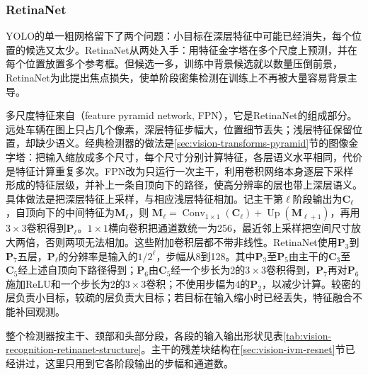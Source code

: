 \subsubsection{RetinaNet}
\label{sec:vision-recognition-fpn}
\label{sec:vision-recognition-retinanet}

YOLO的单一粗网格留下了两个问题：小目标在深层特征中可能已经消失，每个位置的候选又太少。RetinaNet从两处入手：用特征金字塔在多个尺度上预测，并在每个位置放置多个参考框。但候选一多，训练中背景候选就以数量压倒前景，RetinaNet为此提出焦点损失，使单阶段密集检测在训练上不再被大量容易背景主导。

多尺度特征来自（feature pyramid network, FPN），它是RetinaNet的组成部分。远处车辆在图上只占几个像素，深层特征步幅大，位置细节丢失；浅层特征保留位置，却缺少语义。经典检测器的做法是\ref{sec:vision-transforms-pyramid}节的图像金字塔：把输入缩放成多个尺寸，每个尺寸分别计算特征，各层语义水平相同，代价是特征计算重复多次。FPN改为只运行一次主干，利用卷积网络本身逐层下采样形成的特征层级，并补上一条自顶向下的路径，使高分辨率的层也带上深层语义。具体做法是把深层特征上采样，与相应浅层特征相加。记主干第$\ell$阶段输出为$\bm{C}_\ell$，自顶向下的中间特征为$\bm{M}_\ell$，则
$\bm{M}_\ell=\operatorname{Conv}_{1\times1}(\bm{C}_\ell)+\operatorname{Up}(\bm{M}_{\ell+1})$，再用$3\times3$卷积得到$\bm{P}_\ell$。$1\times1$横向卷积把通道数统一为256，最近邻上采样把空间尺寸放大两倍，否则两项无法相加。这些附加卷积层都不带非线性。RetinaNet使用$\bm{P}_3$到$\bm{P}_7$五层，$\bm{P}_\ell$的分辨率是输入的$1/2^\ell$，步幅从8到128。其中$\bm{P}_3$至$\bm{P}_5$由主干的$\bm{C}_3$至$\bm{C}_5$经上述自顶向下路径得到；$\bm{P}_6$由$\bm{C}_5$经一个步长为2的$3\times3$卷积得到，$\bm{P}_7$再对$\bm{P}_6$施加ReLU和一个步长为2的$3\times3$卷积；不使用步幅为4的$\bm{P}_2$，以减少计算。较密的层负责小目标，较疏的层负责大目标；若目标在输入缩小时已经丢失，特征融合不能补回观测。

整个检测器按主干、颈部和头部分段，各段的输入输出形状见表\ref{tab:vision-recognition-retinanet-structure}。主干的残差块结构在\ref{sec:vision-ivm-resnet}节已经讲过，这里只用到它各阶段输出的步幅和通道数。

